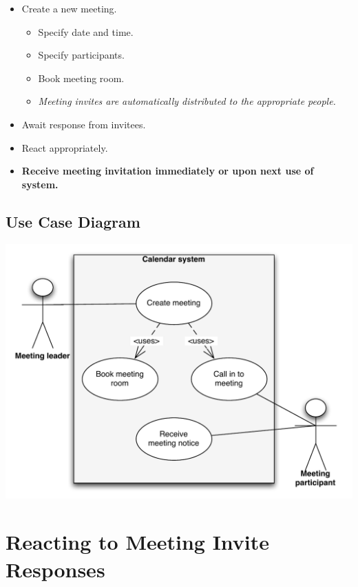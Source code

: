 \documentclass{article}
\begin{document}
\begin{itemize}
\item Create a new meeting.

\begin{itemize} \item Specify date and time.

\item Specify participants.

\item Book meeting room.

\item \textit{Meeting invites are automatically distributed to the
appropriate people.}
\end{itemize}

\item Await response from invitees.

\item React appropriately.

\item \textbf{Receive meeting invitation immediately or upon next use of
system.}
\end{itemize}

\subsection{Use Case Diagram}

\includegraphics[scale=0.9]{usecase2FP.pdf}

\section{Reacting to Meeting Invite Responses}
\end{document}
